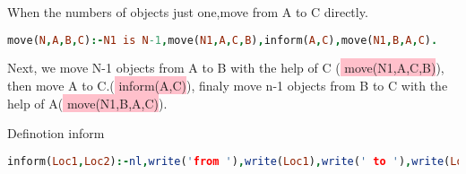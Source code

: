 \documentclass[a4paper, 11pt]{article}
\begin{document}
When the numbers of objects just one,move from A to C directly.

\begin{lstlisting}[language={prolog}]
move(N,A,B,C):-N1 is N-1,move(N1,A,C,B),inform(A,C),move(N1,B,A,C).
\end{lstlisting}

Next, we move N-1 objects from A to B with the help of C (\colorbox{pink}{\color{black} move(N1,A,C,B)}), then move A to C.(\colorbox{pink}{\color{black} inform(A,C)}), finaly move n-1 objects from B to C with the help of A(\colorbox{pink}{\color{black} move(N1,B,A,C)}).

Definotion inform
\begin{lstlisting}[language={prolog}]
inform(Loc1,Loc2):-nl,write('from '),write(Loc1),write(' to '),write(Loc2).
\end{lstlisting}



%
%
\end{document}
